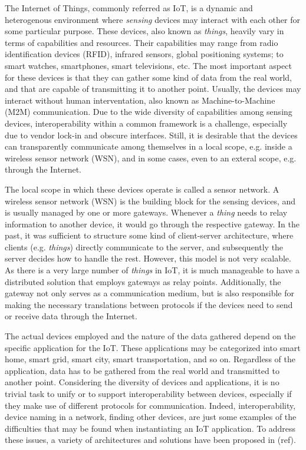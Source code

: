 \documentclass[12pt]{article}
\begin{document}
The Internet of Things, commonly referred as IoT, is a dynamic and heterogenous environment where \emph{sensing} devices may interact with each other for some particular purpose. These devices, also known as \emph{things}, heavily vary in terms of capabilities and resources. Their capabilities may range from radio identification devices (RFID), infrared sensors, global positioning systems; to smart watches, smartphones, smart televisions, etc. The most important aspect for these devices is that they can gather some kind of data from the real world, and that are capable of transmitting it to another point. Usually, the devices may interact without human interventation, also known as Machine-to-Machine (M2M) communication. Due to the wide diversity of capabilities among sensing devices, interoperability within a common framework is a challenge, especially due to vendor lock-in and obscure interfaces. Still, it is desirable that the devices can transparently communicate among themselves in a local scope, e.g. inside a wireless sensor network (WSN), and in some cases, even to an exteral scope, e.g. through the Internet.

The local scope in which these devices operate is called a sensor network. A wireless sensor network (WSN) is the building block for the sensing devices, and is usually managed by one or more gateways. Whenever a \emph{thing} needs to relay information to another device, it would go through the respective gateway. In the past, it was sufficient to structure some kind of client-server architecture, where clients (e.g. \emph{things}) directly communicate to the server, and subsequently the server decides how to handle the rest. However, this model is not very scalable. As there is a very large number of \emph{things} in IoT, it is much manageable to have a distributed solution that employs gateways as relay points. Additionally, the gateway not only serves as a communication medium, but is also responsible for making the necessary translations between protocols if the devices need to send or receive data through the Internet.

The actual devices employed and the nature of the data gathered depend on the specific application for the IoT. These applications may be categorized into smart home, smart grid, smart city, smart transportation, and so on. Regardless of the application, data has to be gathered from the real world and transmitted to another point. Considering the diversity of devices and applications, it is no trivial task to unify or to support interoperability between devices, especially if they make use of different protocols for communication. Indeed, interoperability, device naming in a network, finding other devices, are just some examples of the difficulties that may be found when instantiating an IoT application. To address these issues, a variety of architectures and solutions have been proposed in (ref). 
\end{document}
